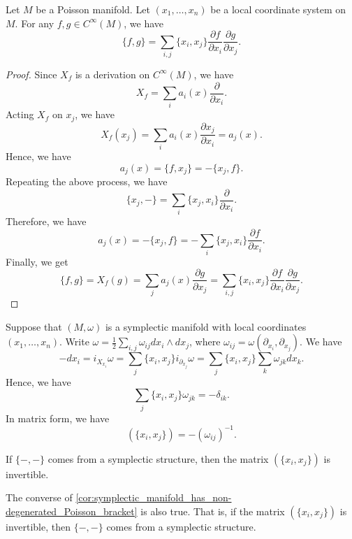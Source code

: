   \begin{lemma}
    Let $M$ be a Poisson manifold.
    Let $(x_1, \dots, x_n)$ be a local coordinate system on $M$.
    For any $f,g \in C^\infty(M)$, we have
    \[ \{f, g\} = \sum_{i,j} \{x_i,x_j\} \frac{\partial f}{\partial x_i} \frac{\partial g}{\partial x_j}. \]
  \end{lemma}
  \begin{proof}
    Since $X_f$ is a derivation on $C^\infty(M)$, we have
    \[ X_f = \sum_i a_i(x) \frac{\partial }{\partial x_i}. \]
    Acting $X_f$ on $x_j$, we have
    \[ X_f(x_j) = \sum_i a_i(x) \frac{\partial x_j}{\partial x_i} = a_j(x). \]
    Hence, we have
    \[ a_j(x) = \{f, x_j\} = -\{x_j, f\}. \]
    Repeating the above process, we have
    \[ \{x_j, - \} = \sum_i \{x_j, x_i\} \frac{\partial }{\partial x_i}. \]
    Therefore, we have
    \[ a_j(x) = -\{x_j, f\} = -\sum_i \{x_j, x_i\} \frac{\partial f}{\partial x_i}. \]
    Finally, we get
    \[ \{f, g\} = X_f(g) = \sum_j a_j(x) \frac{\partial g}{\partial x_j} = \sum_{i,j} \{x_i,x_j\} \frac{\partial f}{\partial x_i} \frac{\partial g}{\partial x_j}. \]
  \end{proof}

  Suppose that $(M, \omega)$ is a symplectic manifold with local coordinates $(x_1, \dots, x_n)$.
  Write $\omega = \frac{1}{2} \sum_{i,j} \omega_{ij} dx_i \wedge dx_j$, where $\omega_{ij} = \omega(\partial_{x_i}, \partial_{x_j})$.
  We have 
  \[ -d x_i = i_{X_{x_i}} \omega =  \sum_j \{x_i, x_j\} i_{\partial_{x_j}} \omega = \sum_j \{x_i, x_j\} \sum_k \omega_{jk} dx_k. \]
  Hence, we have
  \[ \sum_j \{x_i, x_j\} \omega_{jk} = -\delta_{ik}. \]
  In matrix form, we have
  \[ (\{x_i, x_j\}) = -(\omega_{ij})^{-1}. \]

  \begin{corollary}\label{cor:symplectic_manifold_has_non-degenerated_Poisson_bracket}
    If $\{-, -\}$ comes from a symplectic structure, then the matrix $(\{x_i, x_j\})$ is invertible.
  \end{corollary}

  \begin{remark}
    The converse of \cref{cor:symplectic_manifold_has_non-degenerated_Poisson_bracket} is also true.
    That is, if the matrix $(\{x_i, x_j\})$ is invertible, then $\{-, -\}$ comes from a symplectic structure.
  \end{remark}